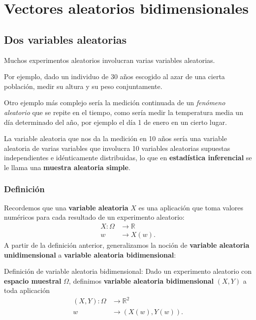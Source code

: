 \documentclass[]{book}
\begin{document}
\hypertarget{vectores-aleatorios-bidimensionales}{%
\chapter{Vectores aleatorios bidimensionales}\label{vectores-aleatorios-bidimensionales}}

\hypertarget{dos-variables-aleatorias}{%
\section{Dos variables aleatorias}\label{dos-variables-aleatorias}}

Muchos experimentos aleatorios involucran varias variables aleatorias.

Por ejemplo, dado un individuo de 30 años escogido al azar de una cierta población, medir su altura y su peso conjuntamente.

Otro ejemplo más complejo sería la medición continuada de un \emph{fenómeno aleatorio} que se repite en el tiempo, como sería medir la temperatura media un día determinado del año, por ejemplo el día 1 de enero en un cierto lugar.

La variable aleatoria que nos da la medición en 10 años sería una variable aleatoria de varias variables que involucra 10 variables aleatorias supuestas independientes e idénticamente distribuidas, lo que en \textbf{estadística inferencial} se le llama una \textbf{muestra aleatoria simple}.

\hypertarget{definiciuxf3n-2}{%
\subsection{Definición}\label{definiciuxf3n-2}}

Recordemos que una \textbf{variable aleatoria} \(X\) es una aplicación que toma valores numéricos para cada resultado de un experimento aleatorio:
\[
\begin{array}{rl}
X: \Omega & \longrightarrow \mathbb{R}\\
w & \longrightarrow X(w).
\end{array}
\]
A partir de la definición anterior, generalizamos la noción de \textbf{variable aleatoria unidimensional} a \textbf{variable aleatoria bidimensional}:

Definición de variable aleatoria bidimensional:
Dado un experimento aleatorio con \textbf{espacio muestral} \(\Omega\), definimos \textbf{variable aleatoria bidimensional} \((X,Y)\) a toda aplicación
\[
\begin{array}{rl}
(X,Y): \Omega & \longrightarrow \mathbb{R}^2\\
w & \longrightarrow (X(w),Y(w)).
\end{array}
\]
\end{document}
